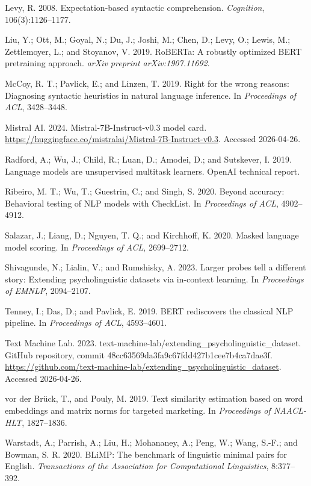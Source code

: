 \documentclass{article}
\begin{document}
\begin{thebibliography}{}
Levy, R. 2008.
Expectation-based syntactic comprehension.
\emph{Cognition}, 106(3):1126--1177.

Liu, Y.; Ott, M.; Goyal, N.; Du, J.; Joshi, M.; Chen, D.; Levy, O.; Lewis, M.; Zettlemoyer, L.; and Stoyanov, V. 2019.
RoBERTa: A robustly optimized BERT pretraining approach.
\emph{arXiv preprint arXiv:1907.11692}.

McCoy, R. T.; Pavlick, E.; and Linzen, T. 2019.
Right for the wrong reasons: Diagnosing syntactic heuristics in natural language inference.
In \emph{Proceedings of ACL}, 3428--3448.

Mistral AI. 2024.
Mistral-7B-Instruct-v0.3 model card.
\url{https://huggingface.co/mistralai/Mistral-7B-Instruct-v0.3}.
Accessed 2026-04-26.

Radford, A.; Wu, J.; Child, R.; Luan, D.; Amodei, D.; and Sutskever, I. 2019.
Language models are unsupervised multitask learners.
OpenAI technical report.

Ribeiro, M. T.; Wu, T.; Guestrin, C.; and Singh, S. 2020.
Beyond accuracy: Behavioral testing of NLP models with CheckList.
In \emph{Proceedings of ACL}, 4902--4912.

Salazar, J.; Liang, D.; Nguyen, T. Q.; and Kirchhoff, K. 2020.
Masked language model scoring.
In \emph{Proceedings of ACL}, 2699--2712.

Shivagunde, N.; Lialin, V.; and Rumshisky, A. 2023.
Larger probes tell a different story: Extending psycholinguistic datasets via in-context learning.
In \emph{Proceedings of EMNLP}, 2094--2107.

Tenney, I.; Das, D.; and Pavlick, E. 2019.
BERT rediscovers the classical NLP pipeline.
In \emph{Proceedings of ACL}, 4593--4601.

Text Machine Lab. 2023.
text-machine-lab/extending\_psycholinguistic\_dataset.
GitHub repository, commit 48cc63569da3fa9c67fdd427b1cee7b4ca7dae3f.
\url{https://github.com/text-machine-lab/extending_psycholinguistic_dataset}.
Accessed 2026-04-26.

vor der Br{\"u}ck, T., and Pouly, M. 2019.
Text similarity estimation based on word embeddings and matrix norms for targeted marketing.
In \emph{Proceedings of NAACL-HLT}, 1827--1836.

Warstadt, A.; Parrish, A.; Liu, H.; Mohananey, A.; Peng, W.; Wang, S.-F.; and Bowman, S. R. 2020.
BLiMP: The benchmark of linguistic minimal pairs for English.
\emph{Transactions of the Association for Computational Linguistics}, 8:377--392.

\end{thebibliography}
\end{document}
